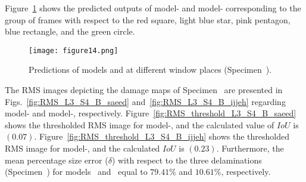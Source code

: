 Figure~\ref{fig:L3_S4_B_5HC_predictions} shows the predicted outputs of model- and model- corresponding to the group of frames with respect to the red square, light blue star, pink pentagon, blue rectangle, and the green circle. 
\begin{figure}[!h]
	\centering
	\texttt{[image: figure14.png]}
	\caption{Predictions of models  and  at different window places (Specimen~).}
	\label{fig:L3_S4_B_5HC_predictions}
\end{figure}

The RMS images depicting the damage maps of Specimen~ are presented in Figs.~\ref{fig:RMS_L3_S4_B_saeed} and~\ref{fig:RMS_L3_S4_B_ijjeh} regarding model- and model-, respectively.
Figure~\ref{fig:RMS_threshold_L3_S4_B_saeed} shows the thresholded RMS image for model-, and the calculated value of \(IoU\) is \((0.07)\).
Figure~\ref{fig:RMS_threshold_L3_S4_B_ijjeh}  shows the thresholded RMS image for model-, and the calculated \(IoU\) is \((0.23)\).
Furthermore, the mean percentage size error (\(\delta\)) with respect to the three delaminations (Specimen~) for models~ and~ equal to \(79.41\%\) and \(10.61\%\), respectively.


